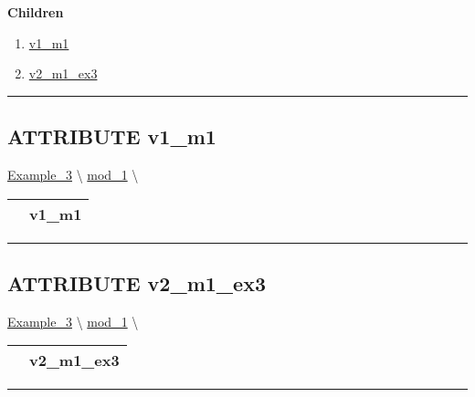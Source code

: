 \par


\textbf{Children}
\begin{enumerate}
\item \hyperlink{ecldoc:intest.in1intest.example_3.mod_1.v1_m1}{v1\_m1}
\item \hyperlink{ecldoc:intest.in1intest.example_3.mod_1.v2_m1_ex3}{v2\_m1\_ex3}
\end{enumerate}

\rule{\linewidth}{0.5pt}

\subsection*{\textsf{\colorbox{headtoc}{\color{white} ATTRIBUTE}
v1\_m1}}

\hypertarget{ecldoc:intest.in1intest.example_3.mod_1.v1_m1}{}
\hspace{0pt} \hyperlink{ecldoc:intest.in1intest.Example_3}{Example_3} \textbackslash 
\hspace{0pt} \hyperlink{ecldoc:intest.in1intest.Example_3.mod_1}{mod_1} \textbackslash 

{\renewcommand{\arraystretch}{1.5}
\begin{tabularx}{\textwidth}{|>{\raggedright\arraybackslash}l|X|}
\hline
\hspace{0pt}\mytexttt{\color{red} } & \textbf{v1\_m1} \\
\hline
\end{tabularx}
}

\par


\rule{\linewidth}{0.5pt}
\subsection*{\textsf{\colorbox{headtoc}{\color{white} ATTRIBUTE}
v2\_m1\_ex3}}

\hypertarget{ecldoc:intest.in1intest.example_3.mod_1.v2_m1_ex3}{}
\hspace{0pt} \hyperlink{ecldoc:intest.in1intest.Example_3}{Example_3} \textbackslash 
\hspace{0pt} \hyperlink{ecldoc:intest.in1intest.Example_3.mod_1}{mod_1} \textbackslash 

{\renewcommand{\arraystretch}{1.5}
\begin{tabularx}{\textwidth}{|>{\raggedright\arraybackslash}l|X|}
\hline
\hspace{0pt}\mytexttt{\color{red} } & \textbf{v2\_m1\_ex3} \\
\hline
\end{tabularx}
}

\par


\rule{\linewidth}{0.5pt}




